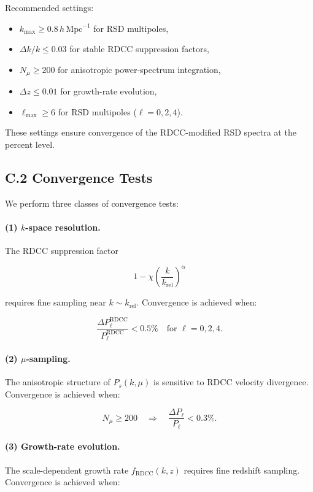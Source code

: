 \documentclass[11pt,a4paper]{article}
\begin{document}
Recommended settings:
\begin{itemize}
\item $k_{\mathrm{max}} \geq 0.8\,h\,\mathrm{Mpc}^{-1}$ for RSD multipoles,
\item $\Delta k / k \leq 0.03$ for stable RDCC suppression factors,
\item $N_{\mu} \geq 200$ for anisotropic power-spectrum integration,
\item $\Delta z \leq 0.01$ for growth-rate evolution,
\item $\ell_{\mathrm{max}} \geq 6$ for RSD multipoles ($\ell = 0,2,4$).
\end{itemize}

These settings ensure convergence of the RDCC-modified RSD spectra at the percent level.

\subsection*{C.2 Convergence Tests}

We perform three classes of convergence tests:

\paragraph{(1) $k$-space resolution.}
The RDCC suppression factor


\[
1 - \chi\left(\frac{k}{k_{\mathrm{rel}}}\right)^{\alpha}
\]


requires fine sampling near $k \sim k_{\mathrm{rel}}$.
Convergence is achieved when:


\[
\frac{\Delta P_{\ell}^{\mathrm{RDCC}}}{P_{\ell}^{\mathrm{RDCC}}} < 0.5\%
\quad \text{for } \ell = 0,2,4.
\]



\paragraph{(2) $\mu$-sampling.}
The anisotropic structure of $P_{s}(k,\mu)$ is sensitive to RDCC velocity divergence.
Convergence is achieved when:


\[
N_{\mu} \geq 200
\quad \Rightarrow \quad
\frac{\Delta P_{\ell}}{P_{\ell}} < 0.3\%.
\]



\paragraph{(3) Growth-rate evolution.}
The scale-dependent growth rate $f_{\mathrm{RDCC}}(k,z)$ requires fine redshift sampling.
Convergence is achieved when:
\end{document}
